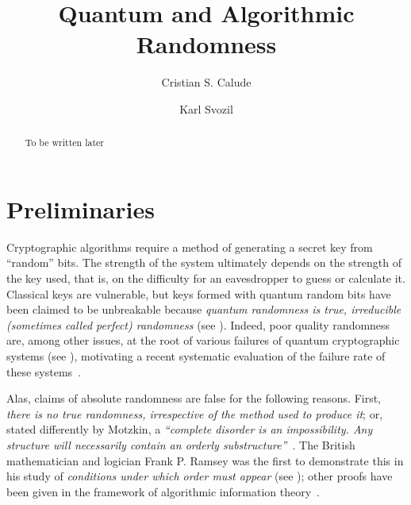 \documentclass[%
 preprint,
 showpacs,
 showkeys,
 preprintnumbers,
  amsmath,amssymb,
  aps,
 pra,
  longbibliography,
  floatfix,
 ]{revtex4-1}
\theoremstyle{plain}
\begin{document}
\title{Quantum and Algorithmic Randomness}
\author{Cristian S. Calude}

\author{Karl Svozil}

\begin{abstract}
To be written later
\end{abstract}




\maketitle

\section{Preliminaries}
\label{sec:preliminaries}

Cryptographic algorithms require a method of generating a secret key  from ``random'' bits.
The strength of the system ultimately depends on the strength of the key used,
that is, on the difficulty for an eavesdropper to guess or calculate it.
Classical keys are vulnerable, but keys formed with quantum random bits have been claimed to be unbreakable because
{\em quantum randomness is true, irreducible (sometimes called perfect) randomness} (see \cite{NatureQ}).
Indeed, poor quality randomness are, among other issues,
at the root of various failures of quantum cryptographic systems (see \cite{CL2008,LWWESM}),
motivating a recent systematic evaluation of the failure rate of these systems~\cite{CLEO2013}.

Alas, claims of absolute randomness are false for the following reasons.
First, {\em there is no true randomness,  irrespective of the method used to produce it};
or, stated differently by Motzkin, a {\em ``complete disorder is an impossibility.
Any structure will necessarily contain an orderly substructure''}~\cite{Soifer}.
The British mathematician and logician Frank P.  Ramsey was the first to demonstrate this
in his study of {\em conditions under which order must appear} (see \cite{GS1990,Soifer});
other proofs have been given in the framework of algorithmic information theory~\cite{Cris2002}.
\end{document}
